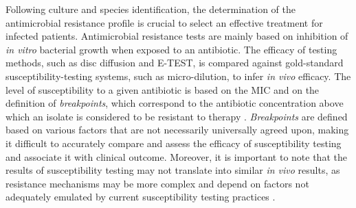 Following culture and species identification, the determination of the antimicrobial resistance profile is crucial to select an effective treatment for infected patients. Antimicrobial resistance tests are mainly based on inhibition of \textit{in vitro} bacterial growth when exposed to an antibiotic. The efficacy of testing methods, such as disc diffusion and E-TEST, is compared against gold-standard susceptibility-testing systems, such as micro-dilution, to infer \textit{in vivo} efficacy.
The level of susceptibility to a given antibiotic is based on the \ac{MIC} and on the definition of \textit{breakpoints}, which correspond to the antibiotic concentration above which an isolate is considered to be resistant to therapy \cite{didelot_transforming_2012}. \textit{Breakpoints} are defined based on various factors that are not necessarily universally agreed upon, making it difficult to accurately compare and assess the efficacy of susceptibility testing and associate it with clinical outcome. Moreover, it is important to note that the results of susceptibility testing may not translate into similar \textit{in vivo} results, as resistance mechanisms may be more complex and depend on factors not adequately emulated by current susceptibility testing practices \cite{didelot_transforming_2012, hassall_limitations_2024}.

